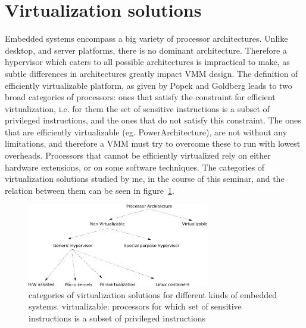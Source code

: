 \documentclass[seminar,twoside]{iitbreport}
\begin{document}
\section{Virtualization solutions}
Embedded systems encompass a big variety of processor architectures. Unlike desktop, and server platforms, there is no dominant architecture. 
Therefore a hypervisor which caters to all possible architectures is impractical to make, as subtle differences in architectures greatly impact VMM design. The definition of efficiently virtualizable platform, as given by Popek and Goldberg\cite{Popek:1974:FRV:361011.361073} leads to
 two broad categories of processors: ones that satisfy the constraint for efficient virtualization, i.e. for them the set of sensitive instructions is a subset of privileged instructions, 
 and the ones that do not satisfy this constraint. The ones that are efficiently virtualizable (eg. PowerArchitecture), are not without any limitations, and therefore a VMM must try to overcome these
 to run with lowest overheads. Processors that cannot be efficiently virtualized rely on either hardware extensions, or on some software techniques. The categories of
 virtualization solutions studied by me, in the course of this seminar, and the relation between them can be seen in figure~\ref{fig:papers}.
\\
 \begin{figure}[ht]
 \centering
 \includegraphics[width=300px]{papers}
 \caption{categories of virtualization solutions for different kinds of embedded systems. \footnotesize{ virtualizable: processors for which set of sensitive instructions is a subset of
 privileged instructions} \label{fig:papers}}
 \end{figure}
    
\end{document}

